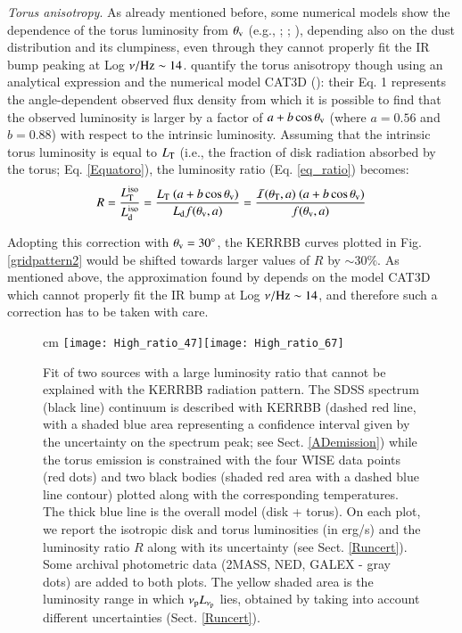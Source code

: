 \documentclass[]{aa}
\begin{document}
\textit{Torus anisotropy}. As already mentioned before, some numerical models show the dependence of the torus luminosity from $\theta_{\rm v}$ (e.g., \citealt{Nenka}; \citealt{HonKish}; \citealt{Stale}), depending also on the dust distribution and its clumpiness, even through they cannot properly fit the IR bump peaking at Log $\nu / {\rm Hz} \sim 14$. \citet{CastiDe} quantify the torus anisotropy though using an analytical expression and the numerical model CAT3D (\citealt{HonKish}): their Eq. 1 represents the angle-dependent observed flux density from which it is possible to find that the observed luminosity is larger by a factor of $a + b \cos \theta_{\rm v}$ (where $a=0.56$ and $b=0.88$) with respect to the intrinsic luminosity. Assuming that the intrinsic torus luminosity is equal to $L_{\rm T}$ (i.e., the fraction of disk radiation absorbed by the torus; Eq. \ref{Equatoro}), the luminosity ratio (Eq. \ref{eq_ratio}) becomes:
\begin{equation}
	R = \frac{L^{\rm iso}_{\rm T}}{L^{\rm iso}_{\rm d}} = \frac{L_{\rm T}\ (a + b \cos \theta_{\rm v})}{L_{\rm d} f(\theta_{\rm v}, a)} = \frac{\mathcal{I}(\theta_{\rm T}, a)\ (a + b \cos \theta_{\rm v})}{f(\theta_{\rm v}, a)}	
\end{equation}

Adopting this correction with $\theta_{\rm v} = 30^{\circ}$, the KERRBB curves plotted in Fig. \ref{gridpattern2} would be shifted towards larger values of $R$ by $\sim 30 \%$. As mentioned above, the approximation found by \citet{CastiDe} depends on the model CAT3D which cannot properly fit the IR bump at Log $\nu / {\rm Hz} \sim 14$, and therefore such a correction has to be taken with care.





\begin{figure*}
\centering
{} cm
\texttt{[image: High\_ratio\_47]}\texttt{[image: High\_ratio\_67]} \caption{Fit of two sources with a large luminosity ratio that cannot be explained with the KERRBB radiation pattern. The SDSS spectrum (black line) continuum is described with KERRBB (dashed red line, with a shaded blue area representing a confidence interval given by the uncertainty on the spectrum peak; see Sect. \ref{ADemission}) while the torus emission is constrained with the four WISE data points (red dots) and two black bodies (shaded red area with a dashed blue line contour) plotted along with the corresponding temperatures. The thick blue line is the overall model (disk + torus). On each plot, we report the isotropic disk and torus luminosities (in erg/s) and the luminosity ratio $R$ along with its uncertainty (see Sect. \ref{Runcert}). Some archival photometric data (2MASS, NED, GALEX - gray dots) are added to both plots. The yellow shaded area is the luminosity range in which $\nu_{\rm p} L_{\nu_{\rm p}}$ lies, obtained by taking into account different uncertainties (Sect. \ref{Runcert}).} 
\label{plot_example_high}
\end{figure*}
\end{document}

